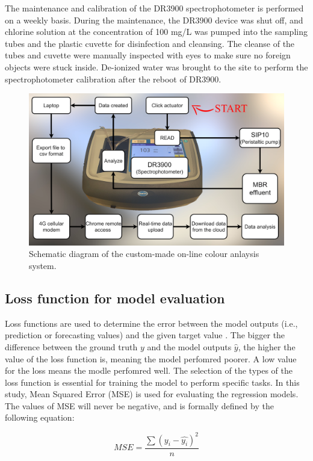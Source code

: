 The maintenance and calibration of the DR3900 spectrophotometer is performed on a weekly basis. During the maintenance, the DR3900 device was shut off, and chlorine solution at the concentration of 100 mg/L was pumped into the sampling tubes and the plastic cuvette for disinfection and cleansing. The cleanse of the tubes and cuvette were manually inspected with eyes to make sure no foreign objects were stuck inside. De-ionized water was brought to the site to perform the spectrophotometer calibration after the reboot of DR3900. 

\begin{figure}[h]
    \centering
    \includegraphics[width=0.8\columnwidth]{imgs/instrument/colour-sampler.png}
    \caption{Schematic diagram of the custom-made on-line colour anlaysis system.}
    \label{fig:diagram-colour-analysis}
 \end{figure}

\subsection{Loss function for model evaluation}
Loss functions are used to determine the error between the model outputs (i.e., prediction or forecasting values) and the given target value \citep{deepaiLossFunction2022}. The bigger the difference between the ground truth \boldmath${y}$ and the model outputs \boldmath${\hat{y}}$, the higher the value of the loss function is, meaning the model perfomred poorer. A low value for the loss means the modle perfomred well. The selection of the types of the loss function is essential for training the model to perform specific tasks. In this study, Mean Squared Error (MSE) is used for evaluating the regression models. The values of MSE will never be negative, and is formally defined by the following equation:

\begin{equation}\label{eq-mse}
    MSE=\frac{\sum (y_i-\hat{y_i})^2}{n}
\end{equation}

